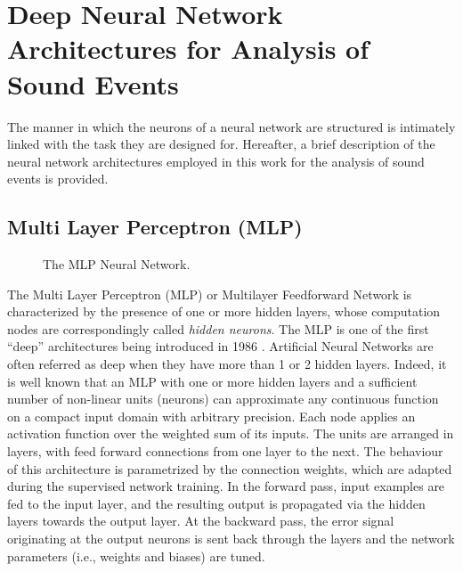 \section{Deep Neural Network Architectures for Analysis of Sound Events}

The manner in which the neurons of a neural network are structured is intimately linked with the task they are designed for. Hereafter, a brief description of the neural network architectures employed in this work for the analysis of sound events is provided.


\subsection{Multi Layer Perceptron (MLP)}


\begin{figure}[h]
	\centering
	\resizebox{0.75\textwidth}{!}{
	}
	\caption[MLP]{The MLP Neural Network.}
	\label{fig:ANN}
\end{figure}

The Multi Layer Perceptron (MLP) or Multilayer Feedforward Network is characterized by the presence of one or more hidden layers, whose computation nodes are correspondingly called \textit{hidden neurons}.
The MLP is one of the first ``deep'' architectures being introduced in 1986 \cite{Rumelhart86-LRB}. Artificial Neural Networks are often referred as deep when they have more than 1 or 2 hidden layers.
Indeed, it is well known that an  MLP with one or more hidden layers and a sufficient number of non-linear units (neurons) can  approximate any continuous  function  on  a  compact  input  domain  with arbitrary precision.
Each node applies an activation function over the weighted sum of its inputs. 
The units are arranged in layers, with feed forward connections from one layer to the next. 
The behaviour of this architecture  is  parametrized  by  the connection weights, which are adapted during the supervised network training.
In the forward pass, input examples are fed to the input layer, and the resulting output is propagated via the hidden layers towards the output layer. At the backward pass, the error signal originating at the output neurons is sent back through the layers and the network parameters (i.e., weights and biases) are tuned.

